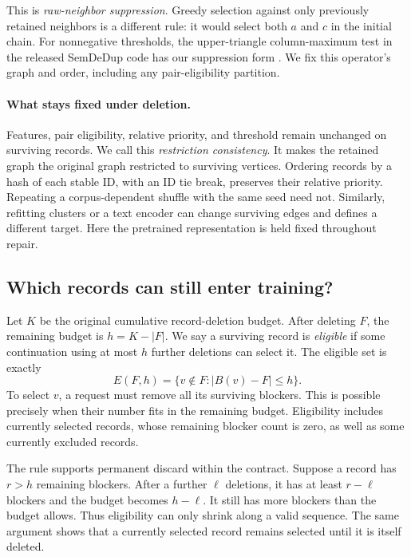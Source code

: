 This is \emph{raw-neighbor suppression}. Greedy selection against only
previously retained neighbors is a different rule: it would select both
$a$ and $c$ in the initial chain. For nonnegative thresholds, the
upper-triangle column-maximum test in the released SemDeDup code has
our suppression form \citep{semcode}. We fix this operator's graph and
order, including any pair-eligibility partition.

\paragraph{What stays fixed under deletion.}
Features, pair eligibility, relative priority, and threshold remain
unchanged on surviving records. We call this \emph{restriction consistency}.
It makes the retained graph the original graph restricted to surviving
vertices. Ordering records by a hash of each stable ID, with an ID tie
break, preserves their relative priority. Repeating a corpus-dependent
shuffle with the same seed need not. Similarly, refitting clusters or a
text encoder can change surviving edges and defines a different target.
Here the pretrained representation is held fixed throughout repair.

\subsection{Which records can still enter training?}
Let $K$ be the original cumulative record-deletion budget. After deleting
$F$, the remaining budget is $h=K-|F|$. We say a surviving record is
\emph{eligible} if some continuation using at most $h$ further deletions
can select it. The eligible set is exactly
\begin{equation}\label{eq:eligible}
 E(F,h)=\{v\notin F:|B(v)\minus F|\le h\}.
\end{equation}
To select $v$, a request must remove all its surviving blockers. This is
possible precisely when their number fits in the remaining budget.
Eligibility includes currently selected records, whose remaining blocker
count is zero, as well as some currently excluded records.

The rule supports permanent discard within the contract. Suppose a record
has $r>h$ remaining blockers. After a further $\ell$ deletions, it has at
least $r-\ell$ blockers and the budget becomes $h-\ell$. It still has
more blockers than the budget allows. Thus eligibility can only shrink
along a valid sequence. The same argument shows that a currently selected
record remains selected until it is itself deleted.

